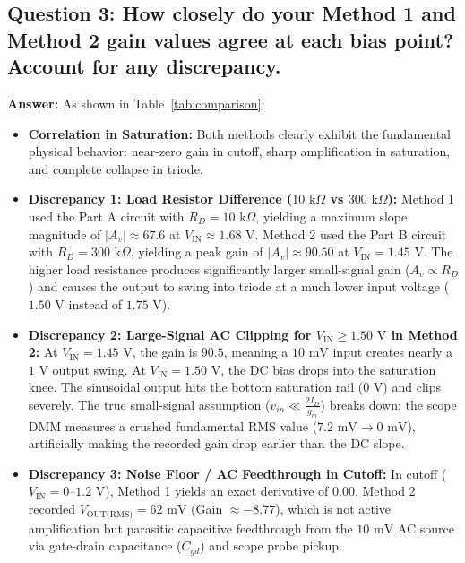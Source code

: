 \documentclass[11pt,a4paper]{article}
\begin{document}
\subsection{Question 3: How closely do your Method 1 and Method 2 gain values agree at each bias point? Account for any discrepancy.}
\textbf{Answer:}
As shown in Table~\ref{tab:comparison}:
\begin{itemize}
    \item \textbf{Correlation in Saturation:} Both methods clearly exhibit the fundamental physical behavior: near-zero gain in cutoff, sharp amplification in saturation, and complete collapse in triode.
    \item \textbf{Discrepancy 1: Load Resistor Difference ($10\text{ k}\Omega$ vs $300\text{ k}\Omega$):} Method 1 used the Part A circuit with $R_D = 10\text{ k}\Omega$, yielding a maximum slope magnitude of $|A_v| \approx 67.6$ at $V_{\text{IN}} \approx 1.68\text{ V}$. Method 2 used the Part B circuit with $R_D = 300\text{ k}\Omega$, yielding a peak gain of $|A_v| \approx 90.50$ at $V_{\text{IN}} = 1.45\text{ V}$. The higher load resistance produces significantly larger small-signal gain ($A_v \propto R_D$) and causes the output to swing into triode at a much lower input voltage ($1.50\text{ V}$ instead of $1.75\text{ V}$).
    \item \textbf{Discrepancy 2: Large-Signal AC Clipping for $V_{\text{IN}} \ge 1.50\text{ V}$ in Method 2:} At $V_{\text{IN}} = 1.45\text{ V}$, the gain is $90.5$, meaning a $10\text{ mV}$ input creates nearly a $1\text{ V}$ output swing. At $V_{\text{IN}} = 1.50\text{ V}$, the DC bias drops into the saturation knee. The sinusoidal output hits the bottom saturation rail ($0\text{ V}$) and clips severely. The true small-signal assumption ($v_{in} \ll \frac{2 I_D}{g_m}$) breaks down; the scope DMM measures a crushed fundamental RMS value ($7.2\text{ mV} \to 0\text{ mV}$), artificially making the recorded gain drop earlier than the DC slope.
    \item \textbf{Discrepancy 3: Noise Floor / AC Feedthrough in Cutoff:} In cutoff ($V_{\text{IN}} = 0\text{--}1.2\text{ V}$), Method 1 yields an exact derivative of $0.00$. Method 2 recorded $V_{\text{OUT(RMS)}} = 62\text{ mV}$ (Gain $\approx -8.77$), which is not active amplification but parasitic capacitive feedthrough from the $10\text{ mV}$ AC source via gate-drain capacitance ($C_{gd}$) and scope probe pickup.
\end{itemize}
\end{document}
